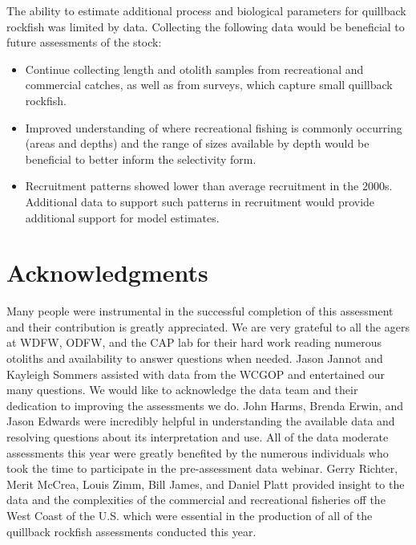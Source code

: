 \documentclass[11pt,
  english,
  a4paper,
]{article}
\begin{document}
\leavevmode\tagmcend\tagstructend


The ability to estimate additional process and biological parameters for quillback rockfish was limited by data. Collecting the following data would be beneficial to future assessments of the stock:

\leavevmode\tagmcend\tagstructend\par

\begin{itemize}

    \item Continue collecting length and otolith samples from recreational and commercial catches, as well as from surveys, which capture small quillback rockfish.

    \item Improved understanding of where recreational fishing is commonly occurring (areas and depths) and the range of sizes available by depth would be beneficial to better inform the selectivity form.  
    
    \item Recruitment patterns showed lower than average recruitment in the 2000s. Additional data to support such patterns in recruitment would provide additional support for model estimates.  
    
\end{itemize}


\hypertarget{acknowledgments}{%
\section{Acknowledgments}\label{acknowledgments}}

\leavevmode\tagmcend\tagstructend


Many people were instrumental in the successful completion of this assessment and their contribution is greatly appreciated. We are very grateful to all the agers at WDFW, ODFW, and the CAP lab for their hard work reading numerous otoliths and availability to answer questions when needed. Jason Jannot and Kayleigh Sommers assisted with data from the WCGOP and entertained our many questions. We would like to acknowledge the data team and their dedication to improving the assessments we do. John Harms, Brenda Erwin, and Jason Edwards were incredibly helpful in understanding the available data and resolving questions about its interpretation and use. All of the data moderate assessments this year were greatly benefited by the numerous individuals who took the time to participate in the pre-assessment data webinar. Gerry Richter, Merit McCrea, Louis Zimm, Bill James, and Daniel Platt provided insight to the data and the complexities of the commercial and recreational fisheries off the West Coast of the U.S. which were essential in the production of all of the quillback rockfish assessments conducted this year.
\end{document}
